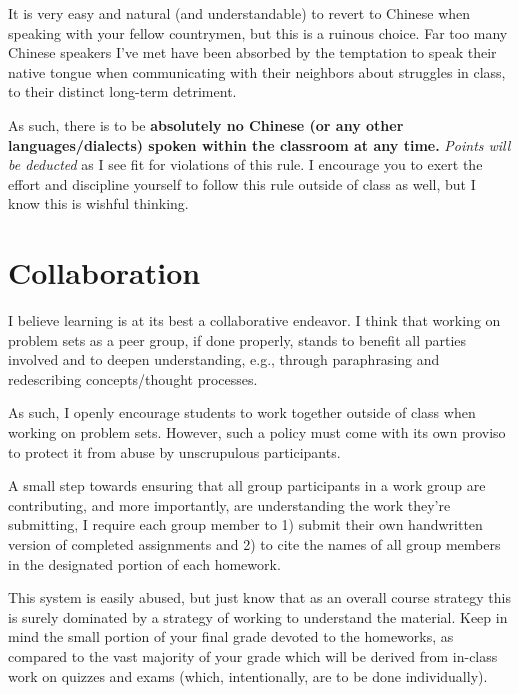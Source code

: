 \documentclass{article}
\begin{document}
It is very easy and natural (and understandable) to revert to Chinese when speaking with your fellow countrymen, but this is a ruinous choice. Far too many Chinese speakers I've met have been absorbed by the temptation to speak their native tongue when communicating with their neighbors about struggles in class, to their distinct long-term detriment.

As such, there is to be \textbf{absolutely no Chinese (or any other languages/dialects) spoken within the classroom at any time.} \textit{Points will be deducted} as I see fit for violations of this rule. I encourage you to exert the effort and discipline yourself to follow this rule outside of class as well, but I know this is wishful thinking.

\section*{Collaboration}

I believe learning is at its best a collaborative endeavor. I think that working on problem sets as a peer group, if done properly, stands to benefit all parties involved and to deepen understanding, e.g., through paraphrasing and redescribing concepts/thought processes.

As such, I openly encourage students to work together outside of class when working on problem sets. However, such a policy must come with its own proviso to protect it from abuse by unscrupulous participants. 

A small step towards ensuring that all group participants in a work group are contributing, and more importantly, are understanding the work they're submitting, I require each group member to 1) submit their own handwritten version of completed assignments and 2) to cite the names of all group members in the designated portion of each homework. 

This system is easily abused, but just know that as an overall course strategy this is surely dominated by a strategy of working to understand the material. Keep in mind the small portion of your final grade devoted to the homeworks, as compared to the vast majority of your grade which will be derived from in-class work on quizzes and exams (which, intentionally, are to be done individually).
\end{document}
